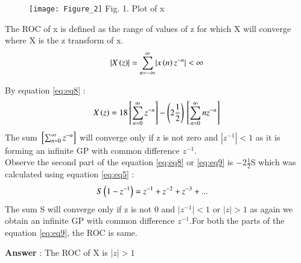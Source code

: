 \documentclass[journal,12pt,twocolumn]{IEEEtran}
\theoremstyle{remark}
\begin{document}
\vspace{4mm}

\begin{figure}[!ht]
    \begin{center}
    \texttt{[image: Figure\_2]}
    Fig. 1. Plot of x \\
    \end{center}
\end{figure}

\FloatBarrier

The ROC of x is defined as the range of values of z for which X will converge where X is the z transform of x.\\
\begin{align}
   \lvert X\left(z\right) \rvert  = \sum_{n = -\infty}^{\infty}\lvert x\left(n\right)z^{-n}\rvert < \infty
\end{align}

By equation \eqref{eq:eq8} :\\
\begin{align}
X\left(z\right) = 18{}\left[\sum_{n=0}^{\infty}z^{-n}\right] - \left(2\frac{1}{2}\right){}\left[\sum_{n=0}^{\infty}nz^{-n}\right] \label{eq:eq9}
\end{align}
The sum $ {}\left[\sum_{n=0}^{\infty}z^{-n}\right]$ will converge only if z is not zero and $\left|z^{-1}\right| < 1$ as it is forming an infinite GP with common difference $z^{-1}$.\\

Observe the second part of the equation \eqref{eq:eq8} or \eqref{eq:eq9} is $-2\frac{1}{2}$S which was calculated using equation \eqref{eq:eq5} : \\
\begin{align}
    S\left(1-z^{-1}\right) &= z^{-1} + z^{-2} + z^{-3} + ... 
\end{align}
The sum S will converge only if z is not 0 and $\lvert z^{-1} \rvert < 1 $ or $ \lvert z \rvert > 1$ as again we obtain an infinite GP with common difference $z^{-1}$.For both the parts of the equation \eqref{eq:eq9}, the ROC is same.

\vspace{4mm}

\large\textbf{Answer} : \normalsize The ROC of X is  $|z| > 1$
\end{document}
